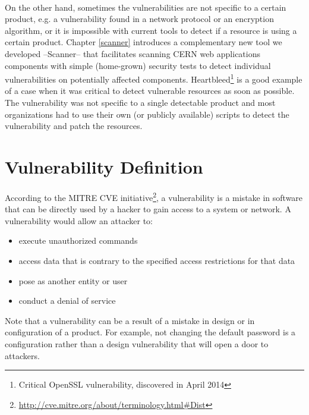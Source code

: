 \paragraph{}
On the other hand, sometimes the vulnerabilities are not specific to a certain product, e.g. a vulnerability found in a network protocol or an encryption algorithm, or it is impossible with current tools to detect if a resource is using a certain product. Chapter \ref{scanner} introduces a complementary new tool we developed --Scanner-- that facilitates scanning CERN web applications components with simple (home-grown) security tests to detect individual vulnerabilities on potentially affected components. Heartbleed\footnote{Critical OpenSSL vulnerability, discovered in April 2014} is a good example of a case when it was critical to detect vulnerable resources as soon as possible. The vulnerability was not specific to a single detectable product and most organizations had to use their own (or publicly available) scripts to detect the vulnerability and patch the resources.

\section{Vulnerability Definition}
According to the MITRE CVE initiative\footnote{\url{http://cve.mitre.org/about/terminology.html\#Dist}}, a vulnerability is a mistake in software that can be directly used by a hacker to gain access to a system or network. A vulnerability would allow an attacker to:
\begin{itemize}
\item execute unauthorized commands
\item access data that is contrary to the specified access restrictions for that data
\item pose as another entity or user
\item conduct a denial of service
\end{itemize}

Note that a vulnerability can be a result of a mistake in design or in configuration of a product. For example, not changing the default password is a configuration rather than a design vulnerability that will open a door to attackers. 

